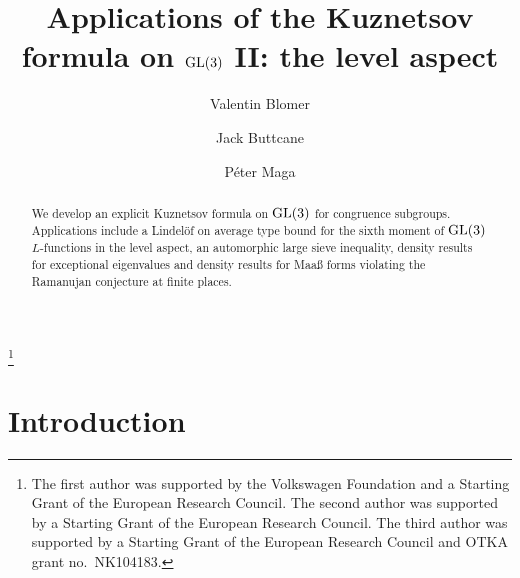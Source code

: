 \documentclass[11pt]{amsart}
\theoremstyle{plain}
\numberwithin{equation}{section}
\theoremstyle{definition}
\begin{document}
\author{Valentin Blomer}
\author{Jack Buttcane}
\author{P\'eter Maga}
\address{Mathematisches Institut, Bunsenstr. 3-5, 37073 G\"ottingen, Germany} 
\address{Department of Mathematics, 
244 Mathematics Building, 
University at Buffalo, 
Buffalo, NY 14260-2900 USA} 
\address{MTA Alfr\'ed R\'enyi Institute of Mathematics, POB 127, Budapest H-1364, Hungary}

\title{Applications of the Kuznetsov formula on ${\rm GL}(3)$ II: the level aspect}
 
 
 
\thanks{The first author was  supported  by the Volkswagen Foundation and a Starting Grant of the European Research Council. The second author was supported by a Starting Grant of the European Research Council. The third author  was supported by a Starting Grant of the European Research Council and  OTKA grant no.\ NK104183.  }


\begin{abstract}  We develop an   explicit Kuznetsov formula on ${\rm GL}(3)$ for congruence subgroups. Applications include a Lindel\"of on average type bound for the sixth moment of ${\rm GL}(3)$ $L$-functions in the level aspect,  an   automorphic large sieve inequality, density results for exceptional eigenvalues and density results for Maa{\ss} forms violating  the Ramanujan conjecture at finite places. 
\end{abstract}


\setcounter{tocdepth}{2}  \maketitle %

 \maketitle



\section{Introduction}
\end{document}
